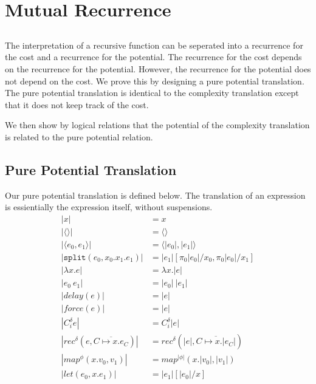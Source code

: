 \chapter{Mutual Recurrence}

\section*{}
The interpretation of a recursive function can be seperated into a recurrence for 
the cost and a recurrence for the potential. The recurrence for the cost depends on
the recurrence for the potential. However, the recurrence for the potential does not 
depend on the cost. We prove this by designing a pure potential translation. The pure
potential translation is identical to the complexity translation except that it does not
keep track of the cost.

We then show by logical relations that the potential of the complexity translation is
related to the pure potential relation.

\section*{Pure Potential Translation}
Our pure potential translation is defined below. The translation of an expression is
essientially the expression itself, without suspensions.
\begin{align*}
  |x| &= x                                                                                     \\
  |\langle\rangle| &= \langle\rangle                                                           \\
  |\langle e_0, e_1 \rangle | &= \langle |e_0|, |e_1| \rangle                                  \\
  |\texttt{split}(e_0, x_0. x_1. e_1)| &= |e_1|[\pi_0|e_0|/x_0, \pi_0|e_0|/x_1]                \\
  |\lambda x.e | &= \lambda x.|e|                                                              \\
  |e_0\ e_1| &= |e_0|\ |e_1|                                                                   \\
  |delay(e)| &= |e|                                                                            \\
  |force(e)| &= |e|                                                                            \\
  |C_i^\delta e| &= C_i^\delta |e|                                                             \\
  |rec^\delta(e, \overline{C \mapsto x.e_C})| &= rec^\delta(|e|, \overline{C \mapsto x.|e_C|}) \\
  |map^\phi(x.v_0, v_1)| &= map^{|\phi|}(x.|v_0|, |v_1|)                                       \\
  |let(e_0, x.e_1)| &= |e_1|[|e_0|/x]
\end{align*}

